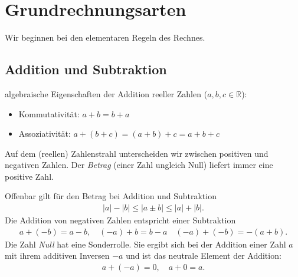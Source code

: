 \thispagestyle{plain}
\section{Grundrechnungsarten}

Wir beginnen bei den elementaren Regeln des Rechnes. 

\subsection{Addition und Subtraktion}
algebraische Eigenschaften der Addition reeller Zahlen ($a,b,c \in \mathbb{R}$):
\begin{itemize}
    \item Kommutativität: $a+b = b+a$
    \item Assoziativität: $a+(b+c) = (a+b)+c = a+b+c$
\end{itemize}

Auf dem (reellen) Zahlenstrahl unterscheiden wir zwischen positiven und negativen Zahlen. Der \emph{Betrag} (einer Zahl ungleich Null) liefert immer eine positive Zahl. 

\begin{figure}[htp]
    \centering
\end{figure}
Offenbar gilt für den Betrag bei Addition und Subtraktion 
\begin{align}
    |a|-|b| \le |a\pm b| \le |a|+|b|.
\end{align}
Die Addition von negativen Zahlen entspricht einer Subtraktion 
\begin{align}
    a+ (-b) = a-b, \quad (-a) + b = b-a \quad (-a)+(-b) = -(a+b).
\end{align}
Die Zahl \emph{Null} hat eine Sonderrolle. Sie ergibt sich bei der Addition einer Zahl $a$ mit ihrem additiven Inversen $-a$ und ist das neutrale Element der Addition:
\begin{align}
    a + (-a) = 0, \quad a + 0 = a.
\end{align}

